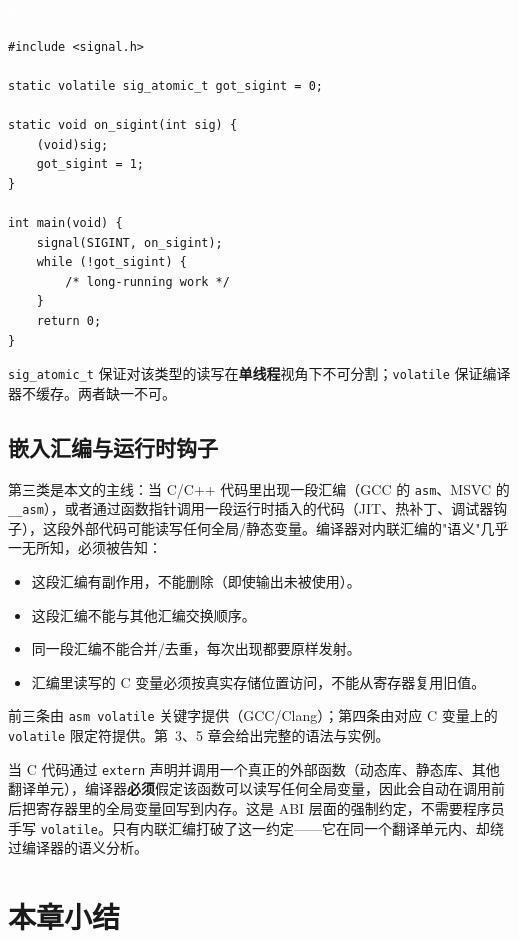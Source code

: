 \documentclass[12pt,a4paper,fontset=fandol]{ctexbook}
\newcommand{\clabel}{%
  \begin{tcolorbox}[enhanced,colback=cheadbg,colframe=cheadbg,
    arc=1mm,boxrule=0mm,left=6pt,right=6pt,top=2pt,bottom=2pt,
    halign=left,oversize]
    \textcolor{white}{\small\bfseries C}
  \end{tcolorbox}\vspace{-4pt}}
\newcommand{\cpp}[1]{C++#1}
\newcommand{\kw}[1]{\texttt{#1}}
\begin{document}
\clabel
\begin{lstlisting}[style=cstyle]
#include <signal.h>

static volatile sig_atomic_t got_sigint = 0;

static void on_sigint(int sig) {
    (void)sig;
    got_sigint = 1;
}

int main(void) {
    signal(SIGINT, on_sigint);
    while (!got_sigint) {
        /* long-running work */
    }
    return 0;
}
\end{lstlisting}

\texttt{sig\_atomic\_t} 保证对该类型的读写在\textbf{单线程}视角下不可分割；\kw{volatile} 保证编译器不缓存。两者缺一不可。

\subsection{嵌入汇编与运行时钩子}\label{sec:volatile-asm}

第三类是本文的主线：当 C/\allowbreak{}\cpp{} 代码里出现一段汇编（GCC 的 \texttt{asm}、MSVC 的 \texttt{\_\_asm}），或者通过函数指针调用一段运行时插入的代码（JIT、热补丁、调试器钩子），这段外部代码可能读写任何全局/静态变量。编译器对内联汇编的"语义"几乎一无所知，必须被告知：

\begin{itemize}[nosep]
  \item 这段汇编有副作用，不能删除（即使输出未被使用）。
  \item 这段汇编不能与其他汇编交换顺序。
  \item 同一段汇编不能合并/去重，每次出现都要原样发射。
  \item 汇编里读写的 C 变量必须按真实存储位置访问，不能从寄存器复用旧值。
\end{itemize}

前三条由 \texttt{asm volatile} 关键字提供（GCC/Clang）；第四条由对应 C 变量上的 \kw{volatile} 限定符提供。第~3、5 章会给出完整的语法与实例。

\begin{tcolorbox}[note={为什么 FFI 调用普通函数不需要 volatile}]
当 C 代码通过 \texttt{extern} 声明并调用一个真正的外部函数（动态库、静态库、其他翻译单元），编译器\textbf{必须}假定该函数可以读写任何全局变量，因此会自动在调用前后把寄存器里的全局变量回写到内存。这是 ABI 层面的强制约定，不需要程序员手写 \kw{volatile}。只有内联汇编打破了这一约定——它在同一个翻译单元内、却绕过编译器的语义分析。
\end{tcolorbox}

\section{本章小结}\label{sec:ch1-summary}
\end{document}
